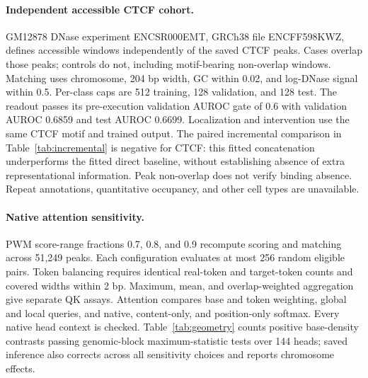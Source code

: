 \paragraph{Independent accessible CTCF cohort.}

GM12878 DNase experiment ENCSR000EMT, GRCh38 file ENCFF598KWZ, defines accessible windows independently of the saved CTCF peaks. Cases overlap those peaks; controls do not, including motif-bearing non-overlap windows. Matching uses chromosome, 204 bp width, GC within 0.02, and log-DNase signal within 0.5. Per-class caps are 512 training, 128 validation, and 128 test. The readout passes its pre-execution validation AUROC gate of 0.6 with validation AUROC 0.6859 and test AUROC 0.6699. Localization and intervention use the same CTCF motif and trained output. The paired incremental comparison in Table~\ref{tab:incremental} is negative for CTCF: this fitted concatenation underperforms the fitted direct baseline, without establishing absence of extra representational information. Peak non-overlap does not verify binding absence. Repeat annotations, quantitative occupancy, and other cell types are unavailable.

\paragraph{Native attention sensitivity.}

PWM score-range fractions 0.7, 0.8, and 0.9 recompute scoring and matching across 51,249 peaks. Each configuration evaluates at most 256 random eligible pairs. Token balancing requires identical real-token and target-token counts and covered widths within 2 bp. Maximum, mean, and overlap-weighted aggregation give separate QK assays. Attention compares base and token weighting, global and local queries, and native, content-only, and position-only softmax. Every native head context is checked. Table~\ref{tab:geometry} counts positive base-density contrasts passing genomic-block maximum-statistic tests over 144 heads; saved inference also corrects across all sensitivity choices and reports chromosome effects.

\begin{table}[t]\centering\caption{Sensitivity counts under both saved families. Within uses 144-head maximum-statistic tests; overall Holm includes all metrics, thresholds, geometries, heads and both resampling summaries.}\label{tab:geometry}\end{table}

